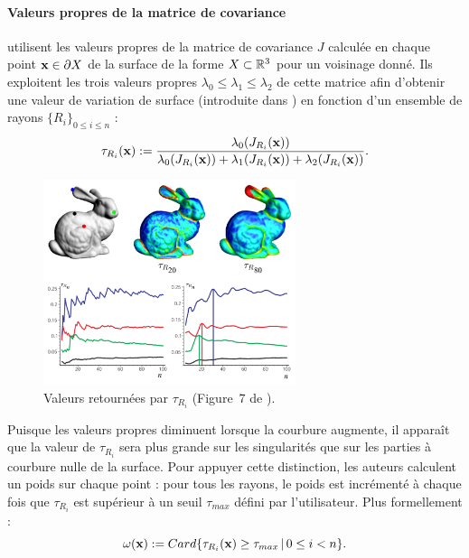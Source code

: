 \paragraph{Valeurs propres de la matrice de covariance}
%
 utilisent les valeurs propres de la matrice de
covariance $J$ calculée en chaque point $\mathbf{x} \in \partial X$ de la surface de la forme
$X \subset \mathbb{R}^3$ pour un voisinage donné. Ils exploitent les trois valeurs
propres $\lambda_0 \leq \lambda_1 \leq \lambda_2$ de cette matrice afin
d'obtenir une valeur de variation de surface (introduite dans \cite{Pauly2002})
en fonction d'un ensemble de rayons $\{ R_i \}_{0 \le i \le n}$ :
%
\begin{equation}
  \tau_{R_i}(\mathbf{x}) := \frac{\lambda_0(J_{R_i}(\mathbf{x}))}{\lambda_0(J_{R_i}(\mathbf{x})) + \lambda_1(J_{R_i}(\mathbf{x})) + \lambda_2(J_{R_i}(\mathbf{x}))}.
\end{equation}
%
\begin{figure}[ht]{
  \begin{center}
    \includegraphics[height=6cm]{images/Feature/PaulyTau}
  \end{center}}
    \caption[Valeurs retournées par $\tau_{R_i}$.]{Valeurs retournées par $\tau_{R_i}$ (Figure~7 de \cite{Pauly2003}).
    \label{fig:pauly-tau}}
\end{figure}
%
Puisque les valeurs propres diminuent lorsque la courbure augmente, il apparaît
que la valeur de $\tau_{R_i}$ sera plus grande sur les singularités que sur les parties
à courbure nulle de la surface. Pour appuyer cette distinction, les auteurs calculent un
poids sur chaque point : pour tous les rayons, le poids est incrémenté à chaque
fois que $\tau_{R_i}$ est supérieur à un seuil $\tau_{max}$ défini par
l'utilisateur. Plus formellement :
%
\begin{equation}
  \label{eq:pauly-omega}
  \omega(\mathbf{x}) := Card \{ \tau_{R_i}(\mathbf{x}) \geq \tau_{max}\,|\,0\leq i < n \}.
\end{equation}
